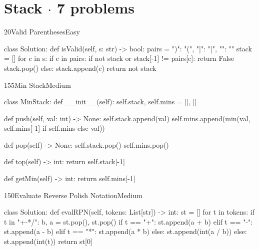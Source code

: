 \section{Stack {\normalsize\color{muted}$\cdot$ 7 problems}}

\begin{problem}{20}{Valid Parentheses}{Easy}
\begin{code}
class Solution:
    def isValid(self, s: str) -> bool:
        pairs = {")": "(", "]": "[", "}": "{"}
        stack = []
        for c in s:
            if c in pairs:
                if not stack or stack[-1] != pairs[c]:
                    return False
                stack.pop()
            else:
                stack.append(c)
        return not stack
\end{code}
\end{problem}

\begin{problem}{155}{Min Stack}{Medium}
\begin{code}
class MinStack:
    def __init__(self):
        self.stack, self.mins = [], []

    def push(self, val: int) -> None:
        self.stack.append(val)
        self.mins.append(min(val, self.mins[-1] if self.mins else val))

    def pop(self) -> None:
        self.stack.pop()
        self.mins.pop()

    def top(self) -> int:
        return self.stack[-1]

    def getMin(self) -> int:
        return self.mins[-1]
\end{code}
\end{problem}

\begin{problem}{150}{Evaluate Reverse Polish Notation}{Medium}
\begin{code}
class Solution:
    def evalRPN(self, tokens: List[str]) -> int:
        st = []
        for t in tokens:
            if t in "+-*/":
                b, a = st.pop(), st.pop()
                if t == "+": st.append(a + b)
                elif t == "-": st.append(a - b)
                elif t == "*": st.append(a * b)
                else: st.append(int(a / b))
            else:
                st.append(int(t))
        return st[0]
\end{code}
\end{problem}

